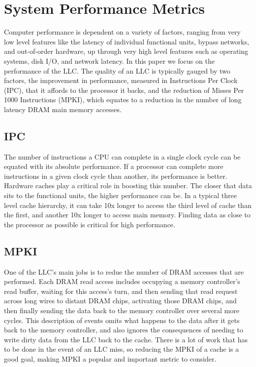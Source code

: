 \section{System Performance Metrics}

Computer performance is dependent on a variety of factors, ranging
from very low level features like the latency of individual functional units, bypass networks,
and out-of-order hardware, up through very high level features such as
operating systems, disk I/O, and network latency.  In this paper we
focus on the performance of the LLC.  
The quality of an LLC is typically gauged by two factors, the improvement in
performance, measured in Instructions Per Clock (IPC),
that it affords to the processor it backs, and the reduction of Misses Per
1000 Instructions (MPKI), which equates to a reduction in the
number of long latency DRAM main memory accesses.

\subsection{IPC}

The number of instructions a CPU can complete in a single clock cycle
can be equated with its absolute performance.  If a processor can
complete more instructions in a given clock cycle than another,
its performance is better.  Hardware caches play a critical role in
boosting this number.  The closer that data sits to the functional
units, the higher performance can be.  In a typical three level cache
hierarchy, it can take 10x longer to access the third level of
cache than the first, and another 10x longer to access main memory.
Finding data as close to the processor as possible is critical for
high performance.

\subsection{MPKI}

One of the LLC's main jobs is to redue the number of DRAM accesses that are
performed.  Each DRAM read access includes occupying a memory
controller's read buffer, waiting for this access's turn, and then
sending that read request across long wires to distant DRAM chips,
activating those DRAM chips, and then finally sending the data back to
the memory controller over several more cycles.  This description of
events omits what happens to the data after it gets back to the memory
controller, and also ignores the consequences of needing to write
dirty data from the LLC back to the cache.  There is a lot of work
that has to be done in the event of an LLC miss, so reducing the MPKI
of a cache is a good goal, making MPKI a popular and important metric to consider.

